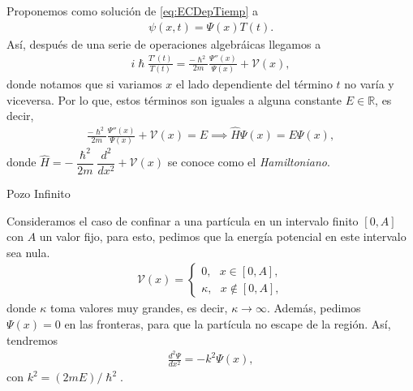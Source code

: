 \documentclass[aspectratio=1610]{beamer}
\newcommand*{\field}[1]{\mathbb{#1}}
\begin{document}
\bgroup
\begin{frame}{}
Proponemos como solución de \eqref{eq:ECDepTiemp} a
\begin{align*}
    \psi(x,t) = \Psi(x)T(t).
\end{align*}
Así, después de una serie de operaciones algebráicas llegamos a 
\begin{align*}
    i\hslash \frac{T'(t) }{T(t)} = \frac{-\hslash ^2 }{2m}\frac{\Psi''(x)}{\Psi(x)} + \mathcal{V}(x),
\end{align*}
donde notamos que si variamos $x$ el lado dependiente del término $t$ no varía y viceversa. Por lo que, estos términos son iguales a alguna constante $E \in \field{R}$, es decir, 
\begin{align*}
\frac{-\hslash ^2 }{2m}\frac{\Psi''(x)}{\Psi(x)} + \mathcal{V}(x) = E \implies 
\hat{H} \Psi(x) = E \Psi(x),
\end{align*}
donde $\hat{H} = - \dfrac{\hslash^2}{2m}\dfrac{d^2}{dx^2} + \mathcal{V}(x)$ se conoce como el  \textit{Hamiltoniano}.

\end{frame}



\begin{frame}{Pozo Infinito}
   
Consideramos el caso de confinar a una partícula en un intervalo finito $[0 , A]$ con $A$ un valor fijo, para esto, pedimos que la energía potencial en este intervalo sea nula.
\begin{align*}
        \mathcal{V}(x) = 
        \left\{ \begin{array}{ll}
        0, \:\:\:  x \in [0,A],
        \\
        \kappa, \:\:\: x \notin [0,A],
        \end{array}
        \right.
\end{align*}
donde $\kappa$ toma valores muy grandes, es decir, $\kappa \to\infty$. Además, pedimos $\Psi(x) = 0$ en las fronteras, para que la partícula no escape de la región. Así, tendremos 
\begin{align*}
    \frac{d^2\Psi}{dx^2} = -k^2\Psi(x),
\end{align*}
con $k^2 = (2mE)/\hslash^2$.
    
\begin{columns}
\column{37em}
\end{columns}
\end{frame}
\end{document}
